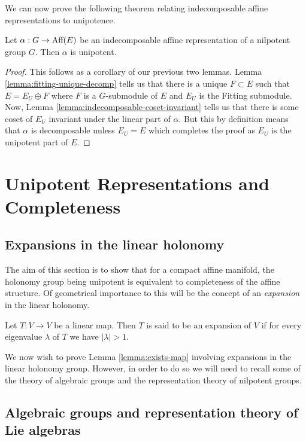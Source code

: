 We can now prove the following theorem relating indecomposable affine
representations to unipotence.
\begin{lemma}\label{lemma:indecomposable-unipotent}
    Let $\alpha: G \to \text{Aff}(E)$ be an indecomposable affine representation of a nilpotent group $G$. Then $\alpha$ is unipotent.
\end{lemma}
\begin{proof}
    This follows as a corollary of our previous two lemmas. Lemma \ref{lemma:fitting-unique-decomp} tells us that there is a unique $F \subset E$
    such that $E = E_U \oplus F$ where $F$ is a $G$-submodule of $E$ and $E_U$ is the Fitting submodule. Now, Lemma \ref{lemma:indecomposable-coset-invariant} tells us
    that there is some coset of $E_U$ invariant under the linear part of $\alpha$. But this by definition means that $\alpha$ is decomposable unless $E_U = E$ which completes the proof as $E_U$
    is the unipotent part of $E$.
\end{proof}
\section{Unipotent Representations and Completeness}

\subsection{Expansions in the linear holonomy}
The aim of this section is to show that for a compact affine manifold, the
holonomy group being unipotent is equivalent to completeness of the affine
structure. Of geometrical importance to this will be the concept of an
\textit{expansion} in the linear holonomy.

\begin{definition}[Expansion]
    Let $T: V \to V$ be a linear map. Then $T$ is said to be an expansion of $V$ if for every eigenvalue
    $\lambda$ of $T$ we have $|\lambda|>1$.
\end{definition}

We now wish to prove Lemma \ref{lemma:exists-map} involving expansions in the
linear holonomy group. However, in order to do so we will need to recall some
of the theory of algebraic groups and the representation theory of nilpotent
groups.

\subsection{Algebraic groups and representation theory of Lie algebras}

